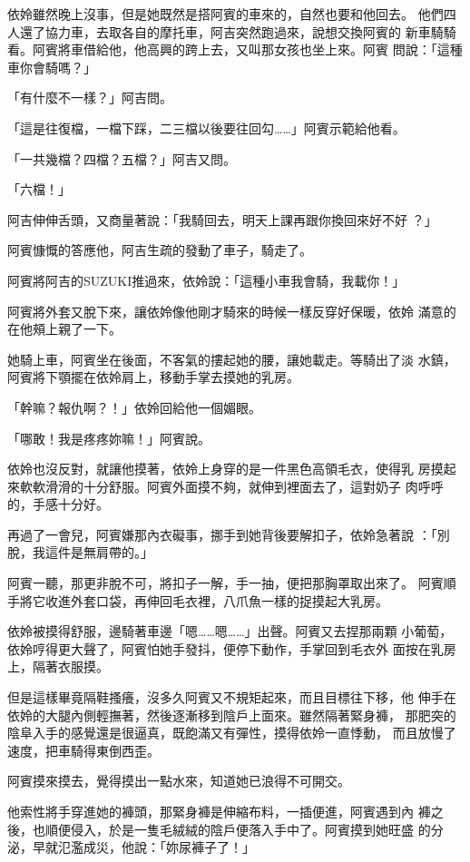 依姈雖然晚上沒事，但是她既然是搭阿賓的車來的，自然也要和他回去。
他們四人還了協力車，去取各自的摩托車，阿吉突然跑過來，說想交換阿賓的
新車騎騎看。阿賓將車借給他，他高興的跨上去，又叫那女孩也坐上來。阿賓
問說：「這種車你會騎嗎？」

「有什麼不一樣？」阿吉問。

「這是往復檔，一檔下踩，二三檔以後要往回勾……」阿賓示範給他看。

「一共幾檔？四檔？五檔？」阿吉又問。

「六檔！」

阿吉伸伸舌頭，又商量著說：「我騎回去，明天上課再跟你換回來好不好
？」

阿賓慷慨的答應他，阿吉生疏的發動了車子，騎走了。

阿賓將阿吉的SUZUKI推過來，依姈說：「這種小車我會騎，我載你！」

阿賓將外套又脫下來，讓依姈像他剛才騎來的時候一樣反穿好保暖，依姈
滿意的在他頰上親了一下。

她騎上車，阿賓坐在後面，不客氣的摟起她的腰，讓她載走。等騎出了淡
水鎮，阿賓將下顎擺在依姈肩上，移動手掌去摸她的乳房。

「幹嘛？報仇啊？！」依姈回給他一個媚眼。

「哪敢！我是疼疼妳嘛！」阿賓說。

依姈也沒反對，就讓他摸著，依姈上身穿的是一件黑色高領毛衣，使得乳
房摸起來軟軟滑滑的十分舒服。阿賓外面摸不夠，就伸到裡面去了，這對奶子
肉呼呼的，手感十分好。

再過了一會兒，阿賓嫌那內衣礙事，挪手到她背後要解扣子，依姈急著說
：「別脫，我這件是無肩帶的。」

阿賓一聽，那更非脫不可，將扣子一解，手一抽，便把那胸罩取出來了。
阿賓順手將它收進外套口袋，再伸回毛衣裡，八爪魚一樣的捉摸起大乳房。

依姈被摸得舒服，邊騎著車邊「嗯……嗯……」出聲。阿賓又去捏那兩顆
小葡萄，依姈哼得更大聲了，阿賓怕她手發抖，便停下動作，手掌回到毛衣外
面按在乳房上，隔著衣服摸。

但是這樣畢竟隔鞋搔癢，沒多久阿賓又不規矩起來，而且目標往下移，他
伸手在依姈的大腿內側輕撫著，然後逐漸移到陰戶上面來。雖然隔著緊身褲，
那肥突的陰阜入手的感覺還是很逼真，既飽滿又有彈性，摸得依姈一直悸動，
而且放慢了速度，把車騎得東倒西歪。

阿賓摸來摸去，覺得摸出一點水來，知道她已浪得不可開交。

他索性將手穿進她的褲頭，那緊身褲是伸縮布料，一插便進，阿賓遇到內
褲之後，也順便侵入，於是一隻毛絨絨的陰戶便落入手中了。阿賓摸到她旺盛
的分泌，早就氾濫成災，他說：「妳尿褲子了！」

